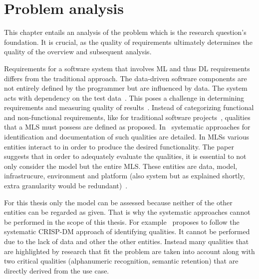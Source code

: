 \chapter{Problem analysis}\label{ch:problem}
This chapter entails an analysis of the problem which is the research question's foundation.
It is crucial, as the quality of requirements ultimately determines the quality of the overview and
subsequent analysis.

Requirements for a software system that involves \ac{ML} and thus \ac{DL} requirements differs from
the traditional approach. The data-driven software components are not entirely defined by the programmer
but are influenced by data.
The system acts with dependency on the test data~\citep{siebert_construction_2021}.
This poses a challenge in determining requirements and measuring quality of
results~\citep{nakamichi_requirements-driven_2020}.
Instead of categorizing functional and non-functional requirements, like for traditional
software projects~\citep{zowghi_requirements_2014}, qualities that a \ac{MLS} must possess
are defined as proposed.
In~\cite{nakamichi_requirements-driven_2020,siebert_construction_2021} systematic approaches for
identification and documentation of such qualities are detailed.
In \acp{MLS} various entities interact to in order to produce the desired functionality.
The paper~\cite{nakamichi_requirements-driven_2020} suggests that in order to adequately evaluate
the qualities, it is essential to not only consider the model but the entire \ac{MLS}.
These entities are data, model, infrastrucure, environment and platform (also system but as explained
shortly, extra granularity would be redundant)~\citep{nakamichi_requirements-driven_2020,
siebert_construction_2021}.

For this thesis only the model can be assessed because neither of the other entities can be regarded
as given.
That is why the systematic approaches cannot be performed in the scope of this thesis.
For example~\cite{siebert_construction_2021} proposes to follow the systematic CRISP-DM approach of
identifying qualities.
It cannot be performed due to the lack of data and other the other entities.
Instead many qualities that are highlighted by research that fit the problem are taken into account
along with two critical qualities (alphanumeric recognition, semantic retention) that are directly
derived from the use case.

